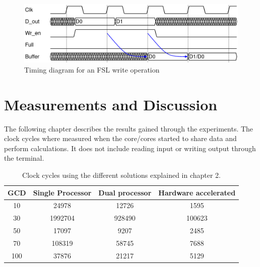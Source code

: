 \documentclass[11pt]{article}
\begin{document}
\begin{figure}[!htb]
   \centering
   \includegraphics[width=1\textwidth]{timingdiagrams/write.pdf}
   \caption{Timing diagram for an FSL write operation}
   \label{fig:fsl-write}
\end{figure}

\section{Measurements and Discussion\label{sec:measurements}}
The following chapter describes the results gained through the experiments. The clock cycles where measured when the core/cores started to share data and perform calculations. It does not include reading input or writing output through the terminal.

\begin{table}[htbp]
   \centering
   \begin{tabular}{@{} cccc @{}} %
      \toprule
      \cmidrule(r){1-2} %
	GCD	& Single Processor	& Dual processor	& Hardware accelerated\\
      \midrule
      10	& 24978			& 12726			&1595\\
      30	& 1992704		&  928490		&100623\\
      50	& 17097			& 9207			&2485\\
      70	& 108319		& 58745			&7688\\
     100	& 37876			&  21217		&5129\\
      \bottomrule
   \end{tabular}
   \caption{Clock cycles using the different solutions explained in chapter 2.}
   \label{tab:Clockcycles}
\end{table}
\end{document}
